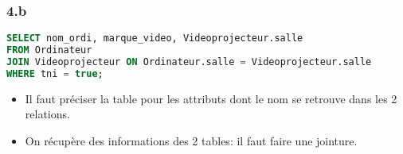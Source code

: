 \documentclass[svgnames,11pt]{beamer}
\begin{document}
\begin{frame}[fragile]
    \frametitle{4.b}

    \begin{center}
        \begin{lstlisting}[language=SQL , basicstyle=\ttfamily\small, xleftmargin=.5em, xrightmargin=0em]
SELECT nom_ordi, marque_video, Videoprojecteur.salle 
FROM Ordinateur
JOIN Videoprojecteur ON Ordinateur.salle = Videoprojecteur.salle
WHERE tni = true;
\end{lstlisting}
    \end{center}
\begin{aretenir}[Remarques]
\begin{itemize}
    \item Il faut préciser la table pour les attributs dont le nom se retrouve dans les 2 relations.
    \item On récupère des informations des 2 tables: il faut faire une jointure.
\end{itemize}
\end{aretenir}
\end{frame}
\end{document}
